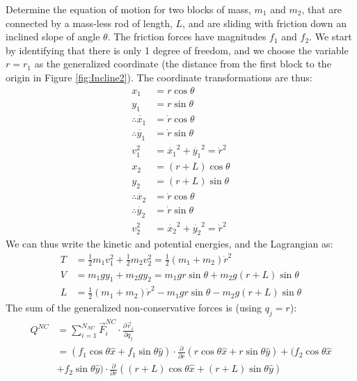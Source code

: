 \begin{example}{0pt}{Determine the equation of motion for two blocks of mass, $m_1$ and $m_2$, that are connected by a mass-less rod of length, $L$, and are sliding with friction down an inclined slope of angle $\theta$. The friction forces have magnitudes $f_1$ and $f_2$.}{}
We start by identifying that there is only 1 degree of freedom, and we choose the variable $r=r_1$ as the generalized coordinate (the distance from the first block to the origin in Figure \ref{fig:Incline2}). The coordinate transformations are thus:
\begin{align*}
x_1&=r\cos{\theta}\nonumber\\
y_1&=r\sin{\theta}\nonumber\\
\therefore\dot{x_1}&=\dot{r}\cos{\theta}\nonumber\\
\therefore\dot{y_1}&=\dot{r}\sin{\theta}\nonumber\\
v_1^2&=\dot{x_1}^2+\dot{y_1}^2=\dot{r}^2\\
x_2&=(r+L)\cos{\theta}\nonumber\\
y_2&=(r+L)\sin{\theta}\nonumber\\
\therefore\dot{x_2}&=\dot{r}\cos{\theta}\nonumber\\
\therefore\dot{y_2}&=\dot{r}\sin{\theta}\nonumber\\
v_2^2&=\dot{x_2}^2+\dot{y_2}^2=\dot{r}^2
\end{align*}
We can thus write the kinetic and potential energies, and the Lagrangian as:
\begin{align*}
T&=\frac{1}{2}m_1v_1^2+\frac{1}{2}m_2v_2^2=\frac{1}{2}(m_1+m_2)\dot{r}^2\nonumber\\
V&=m_1gy_1+m_2gy_2=m_1gr\sin{\theta}+m_2g(r+L)\sin{\theta}\nonumber\\
L&=\frac{1}{2}(m_1+m_2)\dot{r}^2-m_1gr\sin{\theta}-m_2g(r+L)\sin{\theta}
\end{align*}
The sum of the generalized non-conservative forces is (using $q_j=r$):
\begin{align*}
Q^{NC}&=\sum_{i=1}^{N_{NC}}\vec{F}_i^{NC}\cdot\frac{\partial\vec{r}_i}{\partial q_j}\nonumber\\
&=(f_1\cos{\theta}\hat{x}+f_1\sin{\theta}\hat{y})\cdot\frac{\partial}{\partial r} (r\cos{\theta}\hat{x}+r\sin{\theta}\hat{y})+(f_2\cos{\theta}\hat{x}\\
&+f_2\sin{\theta}\hat{y})\cdot\frac{\partial}{\partial r} ((r+L)\cos{\theta}\hat{x}+(r+L)\sin{\theta}\hat{y})\nonumber\\

\end{align*}
\end{example}
